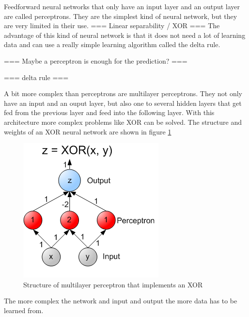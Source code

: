 Feedforward neural networks that only have an input layer and an output layer are called perceptrons. They are the simplest kind of neural network, but they are very limited in their use. === Linear separability / XOR === The advantage of this kind of neural network is that it does not need a lot of learning data and can use a really simple learning algorithm called the delta rule.

=== Maybe a perceptron is enough for the prediction? ===

=== delta rule ===

A bit more complex than perceptrons are multilayer perceptrons. They not only have an input and an ouput layer, but also one to several hidden layers that get fed from the previous layer and feed into the following layer. With this architecture more complex problems like XOR can be solved. The structure and weights of an XOR neural network are shown in figure \ref{multilayer_XOR}

\begin{figure}[ht]
	\centering
  \includegraphics[scale=1]{figures/multilayer_XOR.png}
	\caption[Structure of multilayer perceptron that implements an XOR]{Structure of multilayer perceptron that implements an XOR \protect\footnotemark}
	\label{multilayer_XOR}
\end{figure}

The more complex the network and input and output the more data has to be learned from.